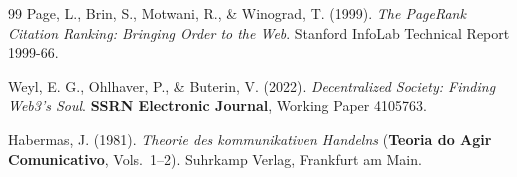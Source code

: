 \documentclass[11pt,a4paper]{article}
\begin{document}
\begin{thebibliography}{99}
Page, L., Brin, S., Motwani, R., \& Winograd, T. (1999).
\emph{The PageRank Citation Ranking: Bringing Order to the Web}.
Stanford InfoLab Technical Report 1999-66.

Weyl, E. G., Ohlhaver, P., \& Buterin, V. (2022).
\emph{Decentralized Society: Finding Web3's Soul}.
\textbf{SSRN Electronic Journal}, Working Paper 4105763.

Habermas, J. (1981).
\emph{Theorie des kommunikativen Handelns} (\textbf{Teoria do Agir Comunicativo}, Vols.\ 1--2).
Suhrkamp Verlag, Frankfurt am Main.

\end{thebibliography}
\end{document}

